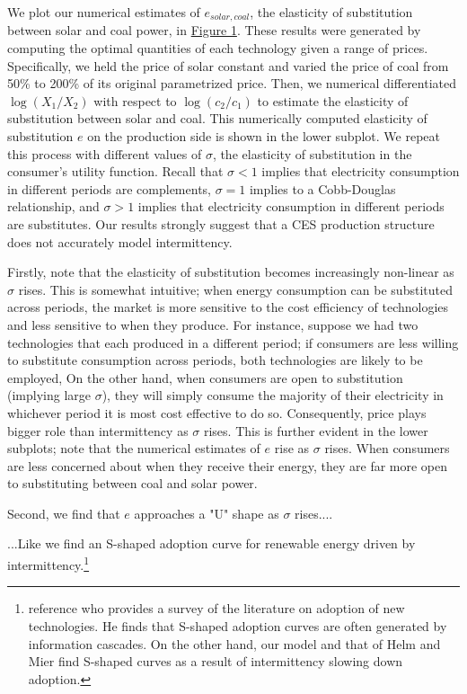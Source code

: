 \documentclass[11pt,a4paper]{extarticle}
\begin{document}
We plot our numerical estimates of $e_{solar, coal}$, the elasticity of substitution between solar and coal power, in \hyperref[fig:eosnum]{Figure 1}. These results were generated by computing the optimal quantities of each technology given a range of prices. Specifically, we held the price of solar constant and varied the price of coal from 50\% to 200\% of its original parametrized price. Then, we numerical differentiated $\log(X_1/X_2)$ with respect to $\log(c_2/c_1)$ to estimate the elasticity of substitution between solar and coal. This numerically computed elasticity of substitution $e$ on the production side is shown in the lower subplot. We repeat this process with different values of $\sigma$, the elasticity of substitution in the consumer's utility function. Recall that $\sigma < 1$ implies that  electricity consumption in different periods are complements, $\sigma = 1$ implies to a Cobb-Douglas relationship, and $\sigma > 1$ implies that electricity consumption in different periods are substitutes. Our results strongly suggest that a CES production structure does not accurately model intermittency. 

Firstly, note that the elasticity of substitution becomes increasingly non-linear as $\sigma$ rises. This is somewhat intuitive; when energy consumption can be substituted across periods, the market is more sensitive to the cost efficiency of technologies and less sensitive to when they produce. For instance, suppose we had two technologies that each produced in a different period; if consumers are less willing to substitute consumption across periods, both technologies are likely to be  employed, On the other hand, when consumers are open to substitution (implying large $\sigma$), they will simply consume the majority of their electricity in whichever period it is most cost effective to do so. Consequently, price plays bigger role than intermittency as $\sigma$ rises. This is further evident in the lower subplots; note that the numerical estimates of  $e$ rise as $\sigma$ rises. When consumers are less concerned about when they receive their energy, they are far more open to substituting between coal and solar power. 

Second, we find that $e$ approaches a "U" shape as $\sigma$ rises.... 

...Like \cite{HH} we find an S-shaped adoption curve for renewable energy driven by intermittency.\footnote{\citet{HH} reference \citet{Geroski2000} who provides a survey of the literature on adoption of new technologies. He finds that S-shaped adoption curves are often generated by information cascades. On the other hand, our model and that of Helm and Mier find S-shaped curves as a result of intermittency slowing down adoption.} 
\end{document}
